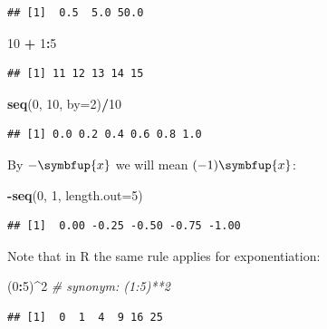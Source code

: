\documentclass[10pt,b5paper,krantz1]{krantz}
\newenvironment{Shaded}{\begin{snugshade}}{\end{snugshade}}
\newcommand{\CommentTok}[1]{\textcolor[rgb]{0.37,0.37,0.37}{\textit{#1}}}
\newcommand{\DataTypeTok}[1]{\textcolor[rgb]{0.27,0.27,0.27}{#1}}
\newcommand{\DecValTok}[1]{\textcolor[rgb]{0.06,0.06,0.06}{#1}}
\newcommand{\KeywordTok}[1]{\textcolor[rgb]{0.27,0.27,0.27}{\textbf{#1}}}
\newcommand{\NormalTok}[1]{#1}
\newcommand{\OperatorTok}[1]{\textcolor[rgb]{0.43,0.43,0.43}{\textbf{#1}}}
\newcommand{\StringTok}[1]{\textcolor[rgb]{0.5,0.5,0.5}{#1}}
\renewcommand{\boldsymbol}[1]{\symbfup{#1}}
\begin{document}
\begin{verbatim}
## [1]  0.5  5.0 50.0
\end{verbatim}

\begin{Shaded}
\begin{Highlighting}[]
\DecValTok{10} \OperatorTok{+}\StringTok{ }\DecValTok{1}\OperatorTok{:}\DecValTok{5}
\end{Highlighting}
\end{Shaded}

\begin{verbatim}
## [1] 11 12 13 14 15
\end{verbatim}

\begin{Shaded}
\begin{Highlighting}[]
\KeywordTok{seq}\NormalTok{(}\DecValTok{0}\NormalTok{, }\DecValTok{10}\NormalTok{, }\DataTypeTok{by=}\DecValTok{2}\NormalTok{)}\OperatorTok{/}\DecValTok{10}
\end{Highlighting}
\end{Shaded}

\begin{verbatim}
## [1] 0.0 0.2 0.4 0.6 0.8 1.0
\end{verbatim}

By \(-\boldsymbol{x}\) we will mean \((-1)\boldsymbol{x}\):

\begin{Shaded}
\begin{Highlighting}[]
\OperatorTok{-}\KeywordTok{seq}\NormalTok{(}\DecValTok{0}\NormalTok{, }\DecValTok{1}\NormalTok{, }\DataTypeTok{length.out=}\DecValTok{5}\NormalTok{)}
\end{Highlighting}
\end{Shaded}

\begin{verbatim}
## [1]  0.00 -0.25 -0.50 -0.75 -1.00
\end{verbatim}

Note that in R the same rule applies for exponentiation:

\begin{Shaded}
\begin{Highlighting}[]
\NormalTok{(}\DecValTok{0}\OperatorTok{:}\DecValTok{5}\NormalTok{)}\OperatorTok{^}\DecValTok{2} \CommentTok{# synonym: (1:5)**2}
\end{Highlighting}
\end{Shaded}

\begin{verbatim}
## [1]  0  1  4  9 16 25
\end{verbatim}
\end{document}
